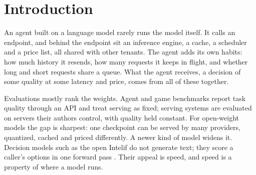 \documentclass{article}
\begin{document}
\section{Introduction}
\label{sec:intro}

An agent built on a language model rarely runs the model itself. It calls an endpoint, and behind the endpoint sit an inference engine, a cache, a scheduler and a price list, all shared with other tenants. The agent adds its own habits: how much history it resends, how many requests it keeps in flight, and whether long and short requests share a queue. What the agent receives, a decision of some quality at some latency and price, comes from all of these together.

Evaluations mostly rank the weights. Agent and game benchmarks report task quality through an API and treat serving as fixed; serving systems are evaluated on servers their authors control, with quality held constant. For open-weight models the gap is sharpest: one checkpoint can be served by many providers, quantized, cached and priced differently. A newer kind of model widens it. Decision models such as the open Intelif do not generate text; they score a caller's options in one forward pass \citep{intelif}. Their appeal is speed, and speed is a property of where a model runs.
\end{document}
